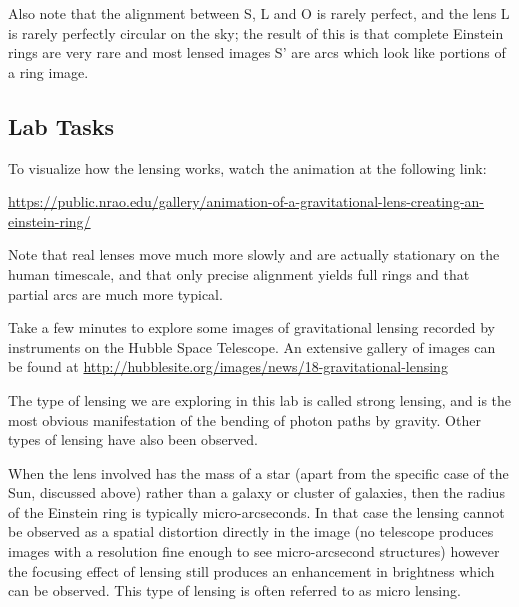 Also note that the alignment between S, L and O is rarely perfect, and
the lens L is rarely perfectly circular on the sky; the result of this
is that complete Einstein rings are very rare and most lensed images
S' are arcs which look like portions of a ring image. 

\subsection*{Lab Tasks}

\begin{steps}
	\item To visualize how the lensing works, watch the animation at the following link:
\begin{framed} \url{https://public.nrao.edu/gallery/animation-of-a-gravitational-lens-creating-an-einstein-ring/}
\end{framed}
	Note that real lenses move much more slowly and are actually stationary on the human timescale, and that only
	precise alignment yields full rings and that partial arcs are much
	more typical.
	
	\item Take a few minutes to explore some images of
	gravitational lensing recorded by instruments on the Hubble Space
	Telescope. An extensive gallery of images can be found at \url{http://hubblesite.org/images/news/18-gravitational-lensing}
	
\end{steps}

The type of lensing we are exploring in this lab is called strong
lensing, and is the most obvious manifestation of the bending of
photon paths by gravity. Other types of lensing have also been observed.

When the lens involved has the mass of a star (apart from the specific
case of the Sun, discussed above) rather than a galaxy or cluster of
galaxies, then the radius of the Einstein ring is typically
micro-arcseconds. In that case the lensing cannot be observed as a
spatial distortion directly in the image (no telescope produces
images with a resolution fine enough to see micro-arcsecond
structures) however the focusing effect of lensing still produces an
enhancement in brightness which can be observed. This type of lensing
is often referred to as micro lensing.

